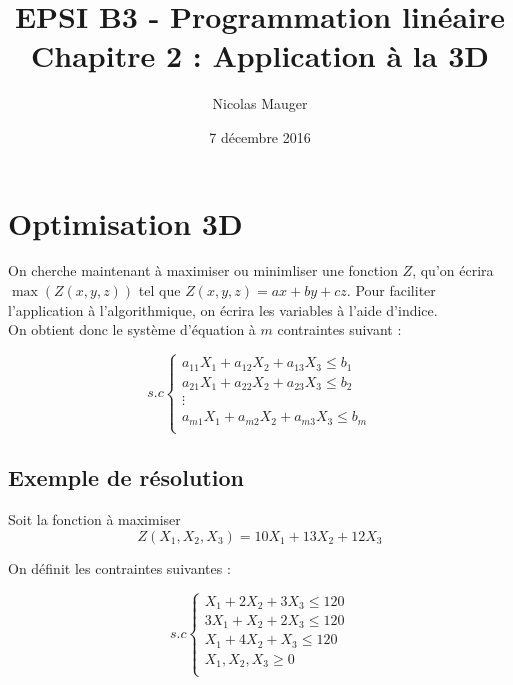 



\title{EPSI B3 - Programmation linéaire\\Chapitre 2 : Application à la 3D}

\author{Nicolas Mauger}

\date{7 décembre 2016}

\maketitle

\section{Optimisation 3D}
On cherche maintenant à maximiser ou minimliser une fonction $Z$, qu'on écrira
$\max(Z(x,y,z))$ tel que $Z(x,y,z) = ax + by + cz$. Pour faciliter l'application
 à l'algorithmique, on écrira les variables à l'aide d'indice. \\

On obtient donc le système d'équation à $m$ contraintes suivant :

\begin{equation*}
  s.c
     \begin{cases}
        a_{11}X_{1} + a_{12}X_{2} + a_{13}X_{3} \leq b_{1} \\
        a_{21}X_{1} + a_{22}X_{2} + a_{23}X_{3} \leq b_{2} \\
        \vdots                           \\
        a_{m1}X_{1} + a_{m2}X_{2} + a_{m3}X_{3} \leq b_{m} \\
     \end{cases}
\end{equation*}

\subsection{Exemple de résolution}
Soit la fonction à maximiser
$$ Z(X_{1},X_{2},X_{3}) = 10X_{1} + 13X_{2} + 12X_{3} $$

On définit les contraintes suivantes :

\begin{equation*}
  s.c
     \begin{cases}
        X_{1} + 2X_{2} + 3X_{3} \leq 120 \\
        3X_{1} + X_{2} + 2X_{3} \leq 120 \\
        X_{1} + 4X_{2} + X_{3} \leq 120 \\
        X_{1}, X_{2}, X_{3} \geq 0 \\
     \end{cases}
\end{equation*}

